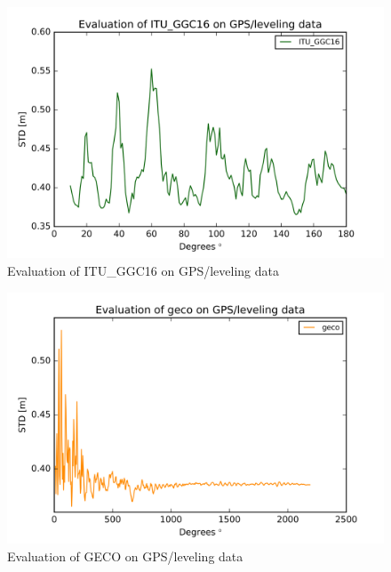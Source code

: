         
        \begin{figure}[t]
        	\caption{Evaluation of ITU\_GGC16 on GPS/leveling data}
        	\label{sudan_data}
        	\includegraphics{Figures/ITU_GGC16_gps_figure.png}
        	\centering
        \end{figure}
        
        
        \begin{figure}[t]
        	\caption{Evaluation of GECO on GPS/leveling data}
        	\label{sudan_data}
        	\includegraphics{Figures/geco_gps_figure.png}
        	\centering
        \end{figure}
        
